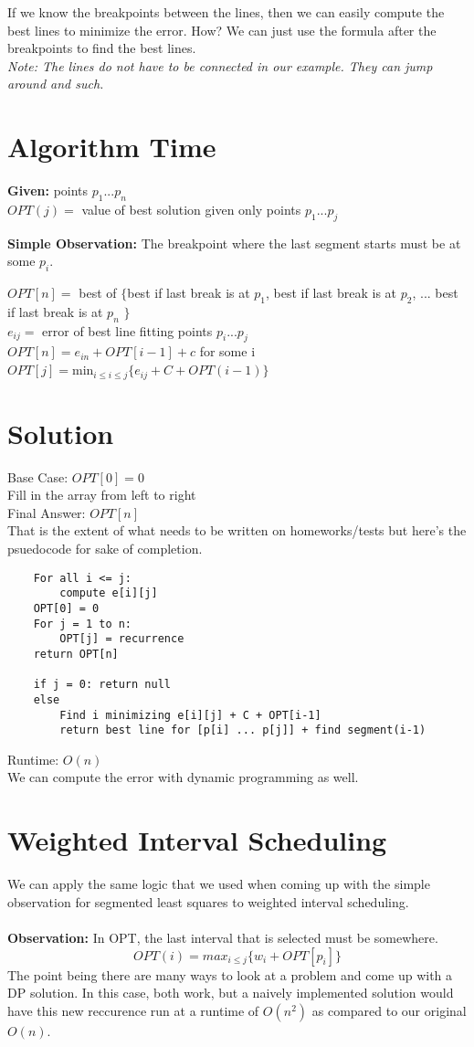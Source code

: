 \documentclass[oneside]{book}
\begin{document}
\clm {} {
    If we know the breakpoints between the lines, then we can easily compute the best lines to minimize the error.
}
How? We can just use the formula after the breakpoints to find the best lines.\\ \textit{Note: The lines do not have to be connected in our example. They can jump around and such.}

\section{Algorithm Time}
\textbf{Given: } points $p_1 ... p_n$ \\
$OPT(j) =$ value of best solution given only points $p_1...p_j$ 

\textbf{Simple Observation: }The breakpoint where the last segment starts must be at some $p_i$.

$OPT[n] =$ best of $\{$best if last break is at $p_1$, best if last break is at $p_2$, ... best if last break is at $p_n$ $\}$\\
$e_{ij} =$ error of best line fitting points  $p_i ... p_j$\\
$OPT[n]= e_{in} + OPT[i-1]+c$ for some i\\
$OPT[j]=$min$_{i\leq i\leq j}\{e_{ij}+C+OPT(i-1)\}$

\section{Solution}
Base Case: $OPT[0] = 0$\\
Fill in the array from left to right\\
Final Answer:  $OPT[n]$\\
That is the extent of what needs to be written on homeworks/tests but here's the psuedocode for sake of completion.

\begin{verbatim}
    For all i <= j:
        compute e[i][j]
    OPT[0] = 0
    For j = 1 to n:
        OPT[j] = recurrence
    return OPT[n]

    if j = 0: return null
    else
        Find i minimizing e[i][j] + C + OPT[i-1]
        return best line for [p[i] ... p[j]] + find segment(i-1)
\end{verbatim}

Runtime: $O(n)$\\
We can compute the error with dynamic programming as well.

\section{Weighted Interval Scheduling}
We can apply the same logic that we used when coming up with the simple observation for segmented least squares to weighted interval scheduling.\\\\
\textbf{Observation:} In OPT, the last interval that is selected must be somewhere.
$$ OPT(i) = max_{i \leq j} \{ w_i + OPT[p_i]\} $$
The point being there are many ways to look at a problem and come up with a DP solution. In this case, both work, but a naively implemented solution would have this new reccurence run at a runtime of $O(n^2)$ as compared to our original $O(n)$.
\end{document}
